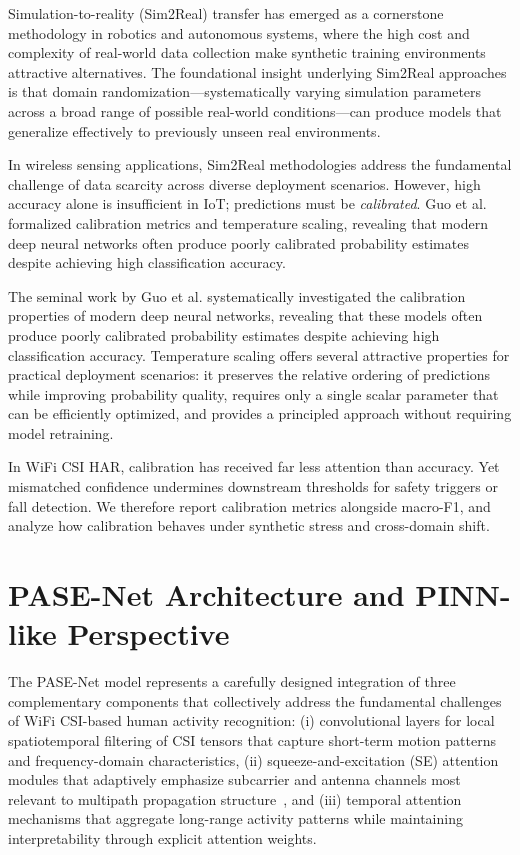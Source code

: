 \documentclass[journal]{IEEEtran}
\begin{document}
Simulation-to-reality (Sim2Real) transfer has emerged as a cornerstone methodology in robotics and autonomous systems, where the high cost and complexity of real-world data collection make synthetic training environments attractive alternatives. The foundational insight underlying Sim2Real approaches is that domain randomization—systematically varying simulation parameters across a broad range of possible real-world conditions—can produce models that generalize effectively to previously unseen real environments.

In wireless sensing applications, Sim2Real methodologies address the fundamental challenge of data scarcity across diverse deployment scenarios. However, high accuracy alone is insufficient in IoT; predictions must be \emph{calibrated}. Guo et al.~\cite{calibration_guo2017} formalized calibration metrics and temperature scaling, revealing that modern deep neural networks often produce poorly calibrated probability estimates despite achieving high classification accuracy.

The seminal work by Guo et al. systematically investigated the calibration properties of modern deep neural networks, revealing that these models often produce poorly calibrated probability estimates despite achieving high classification accuracy. Temperature scaling offers several attractive properties for practical deployment scenarios: it preserves the relative ordering of predictions while improving probability quality, requires only a single scalar parameter that can be efficiently optimized, and provides a principled approach without requiring model retraining.

In WiFi CSI HAR, calibration has received far less attention than accuracy. Yet mismatched confidence undermines downstream thresholds for safety triggers or fall detection. We therefore report calibration metrics alongside macro-F1, and analyze how calibration behaves under synthetic stress and cross-domain shift.

\section{PASE-Net Architecture and PINN-like Perspective}

The PASE-Net model represents a carefully designed integration of three complementary components that collectively address the fundamental challenges of WiFi CSI-based human activity recognition: (i) convolutional layers for local spatiotemporal filtering of CSI tensors that capture short-term motion patterns and frequency-domain characteristics, (ii) squeeze-and-excitation (SE) attention modules that adaptively emphasize subcarrier and antenna channels most relevant to multipath propagation structure~\cite{se_networks2018}, and (iii) temporal attention mechanisms that aggregate long-range activity patterns while maintaining interpretability through explicit attention weights.
\end{document}
